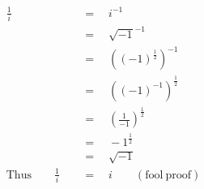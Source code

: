 \begin{align*}
\frac{1}{i}\quad&\,=\quad i^{-1}\\
\,&\,=\quad\sqrt{-1}^{-1}\\
\,&\,=\quad\left((-1)^\frac{1}{2}\right)^{-1}\\
\,&\,=\quad\left((-1)^{-1}\right)^\frac{1}{2}\\
\,&\,=\quad\left(\frac{1}{-1}\right)^\frac{1}{2}\\
\,&\,=\quad-1^\frac{1}{2}\\
\,&\,=\quad\sqrt{-1}\\
\mathrm{Thus}\qquad\frac{1}{i}\quad&\,=\quad i\qquad\mathrm{(fool~proof)}
\end{align*}
